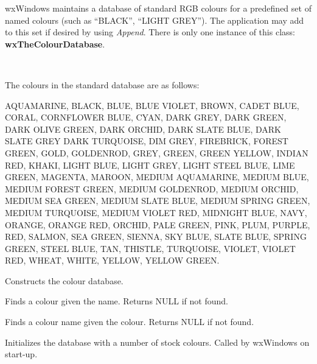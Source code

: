 wxWindows maintains a database of standard RGB colours for a predefined
set of named colours (such as ``BLACK'', ``LIGHT GREY''). The
application may add to this set if desired by using {\it Append}.  There
is only one instance of this class: {\bf wxTheColourDatabase}.


\\


The colours in the standard database are as follows:

AQUAMARINE, BLACK, BLUE, BLUE VIOLET, BROWN, CADET BLUE, CORAL,
CORNFLOWER BLUE, CYAN, DARK GREY, DARK GREEN, DARK OLIVE GREEN, DARK
ORCHID, DARK SLATE BLUE, DARK SLATE GREY DARK TURQUOISE, DIM GREY,
FIREBRICK, FOREST GREEN, GOLD, GOLDENROD, GREY, GREEN, GREEN YELLOW,
INDIAN RED, KHAKI, LIGHT BLUE, LIGHT GREY, LIGHT STEEL BLUE, LIME GREEN,
MAGENTA, MAROON, MEDIUM AQUAMARINE, MEDIUM BLUE, MEDIUM FOREST GREEN,
MEDIUM GOLDENROD, MEDIUM ORCHID, MEDIUM SEA GREEN, MEDIUM SLATE BLUE,
MEDIUM SPRING GREEN, MEDIUM TURQUOISE, MEDIUM VIOLET RED, MIDNIGHT BLUE,
NAVY, ORANGE, ORANGE RED, ORCHID, PALE GREEN, PINK, PLUM, PURPLE, RED,
SALMON, SEA GREEN, SIENNA, SKY BLUE, SLATE BLUE, SPRING GREEN, STEEL
BLUE, TAN, THISTLE, TURQUOISE, VIOLET, VIOLET RED, WHEAT, WHITE, YELLOW,
YELLOW GREEN.




\label{wxcolourdatabaseconstr}


Constructs the colour database.

\label{wxcolourdatabasefindcolour}


Finds a colour given the name. Returns NULL if not found.

\label{wxcolourdatabasefindname}


Finds a colour name given the colour. Returns NULL if not found.

\label{wxcolourdatabaseinitialize}


Initializes the database with a number of stock colours.  Called by wxWindows
on start-up.


